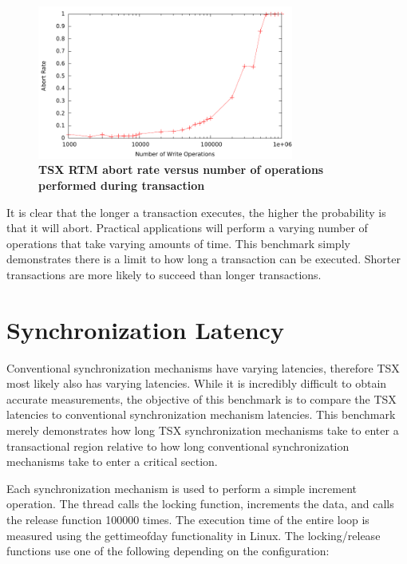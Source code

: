 \documentclass[11pt]{book}
\begin{document}
\begin{figure}[H]
    \centering
    \graphicspath{ {./figures/} }
    \includegraphics[width=0.75\textwidth,keepaspectratio]{trxDuration}
    \caption{\textbf{TSX RTM abort rate versus number of operations performed
    during transaction}}
    \label{fig:trx_duration}
\end{figure}

It is clear that the longer a transaction executes, the higher the probability
is that it will abort.  Practical applications will perform a varying number of
operations that take varying amounts of time.  This benchmark simply
demonstrates there is a limit to how long a transaction can be executed.
Shorter transactions are more likely to succeed than longer transactions.

\section{Synchronization Latency}

Conventional synchronization mechanisms have varying latencies, therefore TSX most likely
also has varying latencies.  While it is incredibly difficult to obtain accurate
measurements, the objective of this benchmark is to compare the TSX latencies to conventional
synchronization mechanism latencies.  This benchmark merely demonstrates how
long TSX synchronization mechanisms take to enter a transactional region relative to how
long conventional synchronization mechanisms take to enter a critical section.

Each synchronization mechanism is used to perform a simple increment operation.
The thread calls the locking function, increments the data, and calls the release
function 100000 times.  The execution time of the entire loop is
measured using the gettimeofday functionality in Linux.  The locking/release
functions use one of the following depending on the configuration: 
\end{document}
